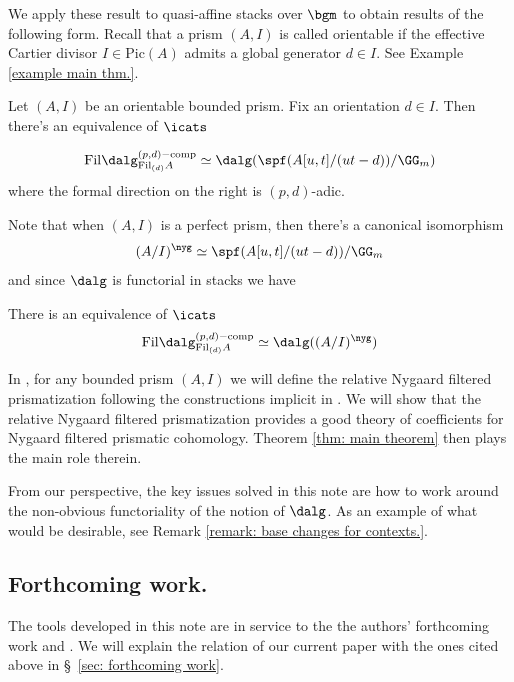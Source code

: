 \documentclass[10pt,reqno]{amsart}
\numberwithin{equation}{section}
\newcommand{\Pic}{\mathrm{Pic}}
\newcommand{\fil}{\mathrm{Fil}}
\begin{document}
We apply these result to quasi-affine stacks over $\bgm$ to obtain results of the following form. Recall that a prism $(A,I)$ is called orientable if the effective Cartier divisor $I\in \Pic(A)$ admits a global generator $d\in I$. See Example \ref{example main thm.}.

\begin{theorem}\label{thm: main theorem}
Let $(A,I)$ be an orientable bounded prism. Fix an orientation $d\in I$. Then there's an equivalence of $\icats$

    $$\fil\dalg^{(p,d)\mathrm{-comp}}_{\fil_{(d)}A}\simeq \dalg(\spf(A[u,t]/(ut-d))/\GG_m)$$ where the formal direction on the right is $(p,d)$-adic.
\end{theorem}

Note that when $(A,I)$ is a perfect prism, then there's a canonical isomorphism 
$$(A/I)^\nyg\simeq \spf(A[u,t]/(ut-d))/\GG_m $$ and since $\dalg$ is functorial in stacks we have 

\begin{corollary}
    There is an equivalence of $\icats$
  $$\fil\dalg^{(p,d)\mathrm{-comp}}_{\fil_{(d)}A}\simeq \dalg((A/I)^\nyg)$$
\end{corollary}

In \cite{Sah25Nyg}, for any bounded prism $(A,I)$ we will define the relative Nygaard filtered prismatization following the constructions implicit in \cite[\S~5]{Bhatt22}. We will show that the
relative Nygaard filtered prismatization provides a good theory of coefficients for Nygaard filtered prismatic cohomology. Theorem \ref{thm: main theorem} then plays the main role therein.




\begin{remark}
    From our perspective, the key issues solved in this note are how to work around the non-obvious functoriality of the notion of $\dalg$. As an example of what would be desirable, see Remark \ref{remark: base changes for contexts.}. 
\end{remark}

\subsection{Forthcoming work.}

The tools developed in this note are in service to the the authors' forthcoming work \cite{Sah25Nyg} and \cite{Sah25Syn}. We will explain the relation of our current paper with the ones cited above in  \S~\ref{sec: forthcoming work}.
\end{document}
